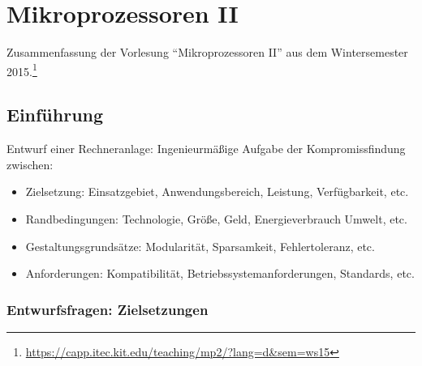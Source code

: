 \chapter{Mikroprozessoren II}

Zusammenfassung der Vorlesung "`Mikroprozessoren II"' aus dem Wintersemester 2015.\footnote{\url{https://capp.itec.kit.edu/teaching/mp2/?lang=d&sem=ws15}}

\section{Einführung}

Entwurf einer Rechneranlage: Ingenieurmäßige Aufgabe der Kompromissfindung zwischen:
\begin{itemize}
	\item Zielsetzung: Einsatzgebiet, Anwendungsbereich, Leistung, Verfügbarkeit, etc.
	\item Randbedingungen: Technologie, Größe, Geld, Energieverbrauch Umwelt, etc.
	\item Gestaltungsgrundsätze: Modularität, Sparsamkeit, Fehlertoleranz, etc.
	\item Anforderungen: Kompatibilität, Betriebssystemanforderungen, Standards, etc.
\end{itemize}


\subsection{Entwurfsfragen: Zielsetzungen}

